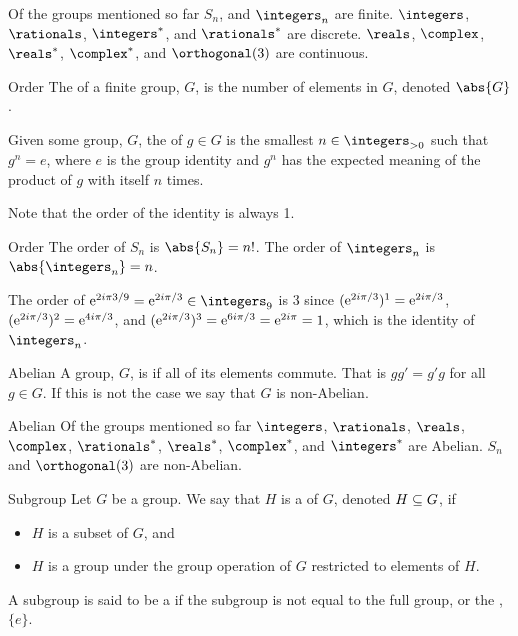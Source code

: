 \begin{exm}{}{}
    Of the groups mentioned so far \(S_n\), and \(\integers_n\) are finite.
    \(\integers\), \(\rationals\), \(\integers^*\), and \(\rationals^*\) are discrete.
    \(\reals\), \(\complex\), \(\reals^*\), \(\complex^*\), and \(\orthogonal(3)\) are continuous.
\end{exm}

\begin{dfn}{Order}{}
    The  of a finite group, \(G\), is the number of elements in \(G\), denoted \(\abs{G}\).
    
    Given some group, \(G\), the  of \(g \in G\) is the smallest \(n \in \positiveintegers\) such that \(g^n = e\), where \(e\) is the group identity and \(g^n\) has the expected meaning of the product of \(g\) with itself \(n\) times.
    
    Note that the order of the identity is always 1.
\end{dfn}

\begin{exm}{Order}{}
    The order of \(S_n\) is \(\abs{S_n} = n!\).
    The order of \(\integers_n\) is \(\abs{\integers_n} = n\).
    
    The order of \(\e^{2i\pi 3/9} = \e^{2i\pi/3} \in \integers_9\) is 3 since \((\mathrm{e}^{2i\pi/3})^1 = \mathrm{e}^{2i\pi/3}\), \((\mathrm{e}^{2i\pi/3})^2 = \mathrm{e}^{4i\pi/3}\), and \((\mathrm{e}^{2i\pi/3})^3 = \mathrm{e}^{6i\pi/3} = \mathrm{e}^{2i\pi} = 1\), which is the identity of \(\integers_n\).
\end{exm}

\begin{dfn}{Abelian}{}
    A group, \(G\), is  if all of its elements commute.
    That is \(gg' = g'g\) for all \(g \in G\).
    If this is not the case we say that \(G\) is non-Abelian.
\end{dfn}

\begin{exm}{Abelian}{}
    Of the groups mentioned so far \(\integers\), \(\rationals\), \(\reals\), \(\complex\), \(\rationals^*\), \(\reals^*\), \(\complex^*\), and \(\integers^*\) are Abelian.
    \(S_n\) and \(\orthogonal(3)\) are non-Abelian.
\end{exm}

\begin{dfn}{Subgroup}{}
    Let \(G\) be a group.
    We say that \(H\) is a  of \(G\), denoted \(H \subseteq G\), if
    \begin{itemize}
        \item \(H\) is a subset of \(G\), and
        \item \(H\) is a group under the group operation of \(G\) restricted to elements of \(H\).
    \end{itemize}
    A subgroup is said to be a  if the subgroup is not equal to the full group, or the , \(\{e\}\).
\end{dfn}

